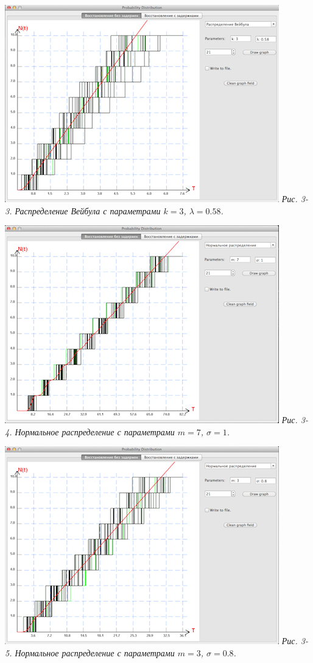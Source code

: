\includegraphics{3-3.png} 
\textit{Рис. 3-3. Распределение Вейбула с параметрами $k = 3$, $\lambda = 0.58$.}

\includegraphics{3-4.png} 
\textit{Рис. 3-4. Нормальное распределение с параметрами $m = 7$, $\sigma = 1$.}

\includegraphics{3-5.png} 
\textit{Рис. 3-5. Нормальное распределение с параметрами $m = 3$, $\sigma= 0.8$.}

